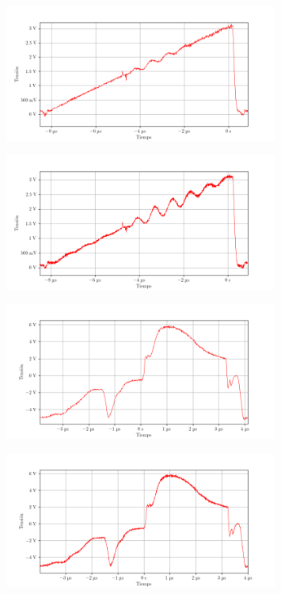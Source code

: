 \begin{figure}[ht]
    \centering
    \includegraphics[width=0.8\textwidth]{images/capturas-osciloscopio/17-11-2022/5.png}
    \caption{}
    \label{fig:osc:5}
\end{figure}

\begin{figure}[ht]
    \centering
    \includegraphics[width=0.8\textwidth]{images/capturas-osciloscopio/17-11-2022/6.png}
    \caption{}
    \label{fig:osc:6}
\end{figure}

\begin{figure}[ht]
    \centering
    \includegraphics[width=0.8\textwidth]{images/capturas-osciloscopio/17-11-2022/7.png}
    \caption{}
    \label{fig:osc:7}
\end{figure}

\begin{figure}[ht]
    \centering
    \includegraphics[width=0.8\textwidth]{images/capturas-osciloscopio/17-11-2022/8.png}
    \caption{}
    \label{fig:osc:8}
\end{figure}

